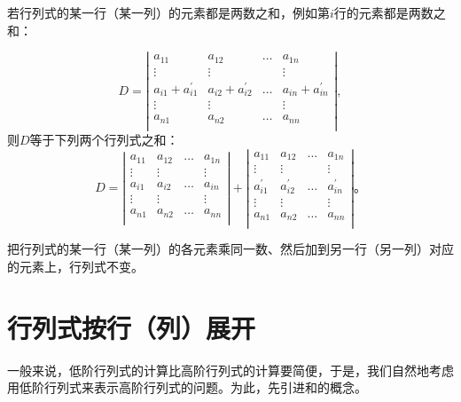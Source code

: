 \begin{性质}
	若行列式的某一行（某一列）的元素都是两数之和，例如第$ i $行的元素都是两数之和：
	
	\begin{equation}
		D=\left |\begin{array}{cccc}
		a_{11} & a_{12} & \dots & a_{1n}\\
		\vdots & \vdots & & \vdots \\
		a_{i1} + a_{i1}^{'} & a_{i2} + a_{i2}^{'} & \dots & a_{in} + a_{in}^{'}\\
		\vdots & \vdots & & \vdots \\
		a_{n1} & a_{n2} & \dots & a_{nn}\\
		\end{array}\right |,
	\end{equation}
	\noindent 则$ D $等于下列两个行列式之和：
	\begin{equation}
		D=\left |\begin{array}{cccc}
		a_{11} & a_{12} & \dots & a_{1n}\\
		\vdots & \vdots & & \vdots \\
		a_{i1} & a_{i2} & \dots & a_{in}\\
		\vdots & \vdots & & \vdots \\
		a_{n1} & a_{n2} & \dots & a_{nn}\\
		\end{array}\right | +
		\left |\begin{array}{cccc}
		a_{11} & a_{12} & \dots & a_{1n}\\
		\vdots & \vdots & & \vdots \\
		a_{i1}^{'} & a_{i2}^{'} & \dots & a_{in}^{'}\\
		\vdots & \vdots & & \vdots \\
		a_{n1} & a_{n2} & \dots & a_{nn}\\
		\end{array}\right | \text{。}
	\end{equation}
\end{性质}

\begin{性质}
	把行列式的某一行（某一列）的各元素乘同一数、然后加到另一行（另一列）对应的元素上，行列式不变。
\end{性质}

\section{行列式按行（列）展开}

一般来说，低阶行列式的计算比高阶行列式的计算要简便，于是，我们自然地考虑用低阶行列式来表示高阶行列式的问题。为此，先引进和的概念。

